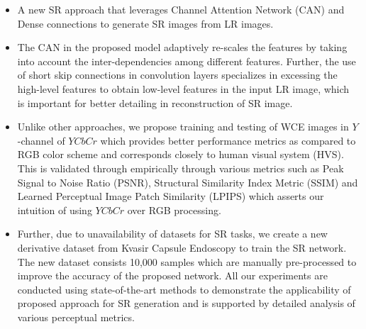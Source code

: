 \documentclass[conference]{IEEEtran}
\begin{document}
\begin{itemize}
    \item A new SR approach that leverages Channel Attention Network (CAN) and Dense connections to generate SR images from LR images. 
    \item The CAN in the proposed model adaptively re-scales the features by taking into account the inter-dependencies among different features. Further, the use of short skip connections in convolution layers specializes in excessing the high-level features to obtain low-level features in the input LR image, which is important for better detailing in reconstruction of SR image. 
    \item Unlike other approaches, we propose training and testing of WCE images in $Y$-channel of $YCbCr$ which provides better performance metrics as compared to RGB color scheme and corresponds closely to human visual system (HVS). This is validated through empirically through various metrics such as Peak Signal to Noise Ratio (PSNR), Structural Similarity Index Metric (SSIM) and Learned Perceptual Image Patch Similarity (LPIPS) which asserts our intuition of using $YCbCr$ over RGB processing. 
    \item Further, due to unavailability of datasets for SR tasks, we create a new derivative dataset from Kvasir Capsule Endoscopy \cite{data} to train the SR network. The new dataset consists 10,000 samples which are manually pre-processed to improve the accuracy of the proposed network. All our experiments are conducted using state-of-the-art methods to demonstrate the applicability of proposed approach for SR generation and is supported by detailed analysis of various perceptual metrics.
\end{itemize}


\end{document}
